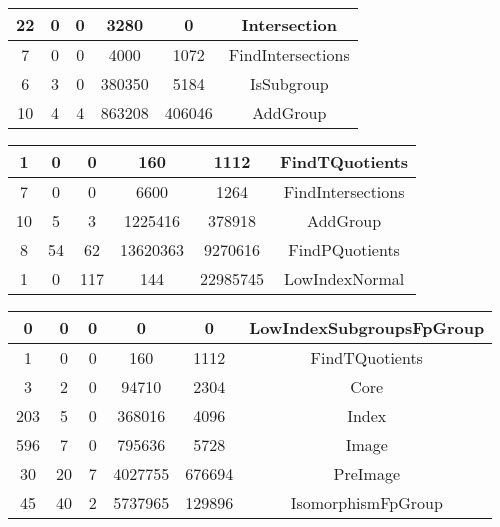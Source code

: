 \documentclass{test}
\begin{document}
\begin{center}
\begin{tabular}{|| c c c c c c ||}
\hline
 22 & 0 & 0 & 3280 & 0 & Intersection \\
\hline
 7 & 0 & 0 & 4000 & 1072 & FindIntersections \\
\hline
 6 & 3 & 0 & 380350 & 5184 & IsSubgroup \\
\hline
 10 & 4 & 4 & 863208 & 406046 & AddGroup \\
\hline
\end{tabular}
\end{center}
\begin{center}
\begin{tabular}{|| c c c c c c ||}
\hline
 1 & 0 & 0 & 160 & 1112 & FindTQuotients \\
\hline
 7 & 0 & 0 & 6600 & 1264 & FindIntersections \\
\hline
 10 & 5 & 3 & 1225416 & 378918 & AddGroup \\
\hline
 8 & 54 & 62 & 13620363 & 9270616 & FindPQuotients \\
\hline
 1 & 0 & 117 & 144 & 22985745 & LowIndexNormal \\
\hline
\end{tabular}
\end{center}
\begin{center}
\begin{tabular}{|| c c c c c c ||}
\hline
 0 & 0 & 0 & 0 & 0 & LowIndexSubgroupsFpGroup \\
\hline
 1 & 0 & 0 & 160 & 1112 & FindTQuotients \\
\hline
 3 & 2 & 0 & 94710 & 2304 & Core \\
\hline
 203 & 5 & 0 & 368016 & 4096 & Index \\
\hline
 596 & 7 & 0 & 795636 & 5728 & Image \\
\hline
 30 & 20 & 7 & 4027755 & 676694 & PreImage \\
\hline
 45 & 40 & 2 & 5737965 & 129896 & IsomorphismFpGroup \\
\hline
\end{tabular}
\end{center}
\end{document}
